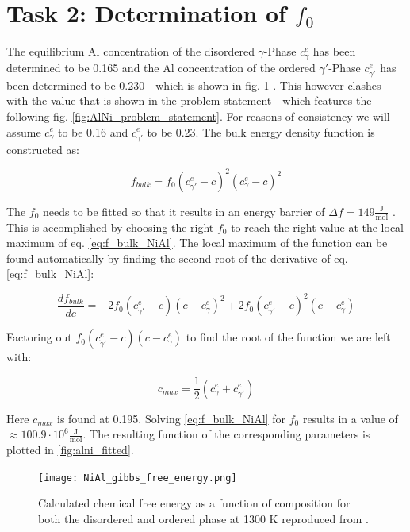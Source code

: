 \section{Task 2: Determination of \(f_{0}\)}
The equilibrium Al concentration of the disordered \(\gamma \)-Phase \(c_{\gamma}^{e}\) has been determined to be 0.165 and the  Al concentration of the ordered \(\gamma ' \)-Phase \(c_{\gamma '}^{e}\) has been determined to be 0.230 - which is shown in fig. \ref{fig:AlNi_gibbs} \cite{zhu2002}. This however clashes with the value that is shown in the problem statement \cite{zaisera} - which features the following fig. \ref{fig:AlNi_problem_statement}. For reasons of consistency we will assume \(c_{\gamma}^{e}\) to be 0.16 and \(c_{\gamma '}^{e}\) to be 0.23. The bulk energy density function is constructed as:

\begin{equation}
	f_{bulk} = f_{0} (c_{\gamma '}^{e} - c)^{2}(c_{\gamma}^{e} - c)^{2} \label{eq:f_bulk_NiAl}
\end{equation}

The \( f_{0}\) needs to be fitted so that it results in an energy barrier of \(\Delta f = 149 \frac{\mathrm{J}}{\mathrm{mol}} \) \cite{zaisera}. This is accomplished by choosing the right \(f_{0}\) to reach the right value at the local maximum of eq. \ref{eq:f_bulk_NiAl}. The local maximum of the function can be found automatically by finding the second root of the derivative of eq. \ref{eq:f_bulk_NiAl}:

\begin{equation}
	\frac{df_{bulk}}{dc} = -2 f_{0} (c_{\gamma '}^{e} - c)(c - c_{\gamma}^{e})^{2} + 2 f_{0} (c_{\gamma '}^{e} - c)^{2}(c - c_{\gamma}^{e})
\end{equation}

Factoring out \(f_{0} (c_{\gamma '}^{e} - c)(c - c_{\gamma}^{e})\) to find the root of the function we are left with:

\begin{equation}
	c_{max} = \frac{1}{2} (c_{\gamma}^{e} + c_{\gamma '}^{e})
\end{equation}

 Here \(c_{max}\) is found at 0.195. Solving \ref{eq:f_bulk_NiAl} for \(f_{0}\) results in a value of \(\approx 100.9 \cdot 10^{6} \frac{\mathrm{J}}{\mathrm{mol}}\).  The resulting function of the corresponding parameters is plotted in \ref{fig:alni_fitted}.


\begin{figure}[htb]
	\centering\texttt{[image: NiAl\_gibbs\_free\_energy.png]}
	\caption{Calculated chemical free energy as a function of composition for both the disordered and ordered phase at 1300 K reproduced from \cite{zhu2002}.}
	\label{fig:AlNi_gibbs}
\end{figure}

